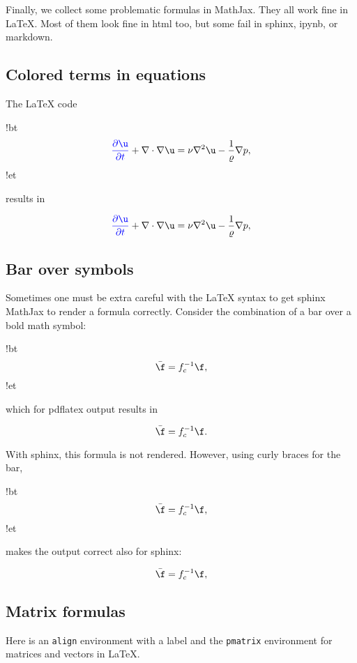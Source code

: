 \documentclass[%
oneside,                 %
final,                   %
10pt]{article}
\begin{document}
Finally, we collect some problematic formulas in MathJax. They all work
fine in {\LaTeX}. Most of them look fine in html too, but some fail in
sphinx, ipynb, or markdown.

\subsection{Colored terms in equations}

The {\LaTeX} code

\blatexcod
!bt
\[ {\color{blue}\frac{\partial\u}{\partial t}} +
\nabla\cdot\nabla\u = \nu\nabla^2\u -
\frac{1}{\varrho}\nabla p,\]
!et
\elatexcod

results in

\[ {\color{blue}\frac{\partial\u}{\partial t}} +
\nabla\cdot\nabla\u = \nu\nabla^2\u -
\frac{1}{\varrho}\nabla p,\]

\subsection{Bar over symbols}

Sometimes one must be extra careful with the {\LaTeX} syntax to get sphinx MathJax
to render a formula correctly. Consider the combination of a bar over a
bold math symbol:

\blatexcod
!bt
\[ \bar\f = f_c^{-1}\f,\]
!et
\elatexcod

which for pdflatex output results in

\[ \bar\f = f_c^{-1}\f.\]

With sphinx, this formula is not rendered. However, using curly braces for the bar,

\blatexcod
!bt
\[ \bar{\f} = f_c^{-1}\f,\]
!et
\elatexcod

makes the output correct also for sphinx:

\[ \bar{\f} = f_c^{-1}\f,\]

\subsection{Matrix formulas}

Here is an \texttt{align} environment with a label and the \texttt{pmatrix}
environment for matrices and vectors in {\LaTeX}.
\end{document}
